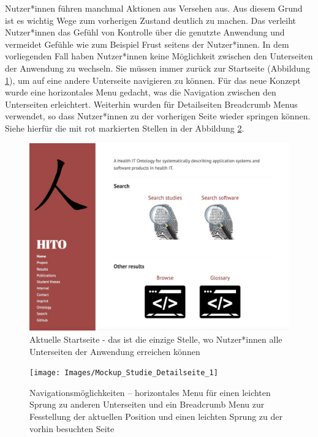 \begin{enumerate}
Nutzer*innen führen manchmal Aktionen aus Versehen aus. 
Aus diesem Grund ist es wichtig Wege zum vorherigen Zustand deutlich zu machen.
Das verleiht Nutzer*innen das Gefühl von Kontrolle über die genutzte Anwendung und vermeidet Gefühle wie zum Beispiel Frust seitens der Nutzer*innen.
In dem vorliegenden Fall haben Nutzer*innen keine Möglichkeit zwischen den Unterseiten der Anwendung zu wechseln.
Sie müssen immer zurück zur Startseite (Abbildung \ref{fig:point3_davor}), um auf eine andere Unterseite navigieren zu können.
Für das neue Konzept wurde eine horizontales Menu gedacht, was die Navigation zwischen den Unterseiten erleichtert.
Weiterhin wurden für Detailseiten Breadcrumb Menus verwendet, so dass Nutzer*innen zu der vorherigen Seite wieder springen können.
Siehe hierfür die mit rot markierten Stellen in der Abbildung \ref{fig:point3_danach}.

\begin{figure}[H]
	\centering
    	\includegraphics[width=1.45\textwidth, angle=90]{Images/Punkt_3_davor}
   	\caption[Aktuelle Startseite]{Aktuelle Startseite - das ist die einzige Stelle, wo Nutzer*innen alle Unterseiten der Anwendung erreichen können}
   	\label{fig:point3_davor}
\end{figure}

\begin{figure}[ht]
	\centering
    	\texttt{[image: Images/Mockup\_Studie\_Detailseite\_1]}
   	\caption[Navigationsmöglichkeiten]{Navigationsmöglichkeiten -- horizontales Menu für einen leichten Sprung zu anderen Unterseiten und ein Breadcrumb Menu zur Fesstellung der aktuellen Position und einen leichten Sprung zu der vorhin besuchten Seite}
   	\label{fig:point3_danach}
\end{figure}


\end{enumerate}
